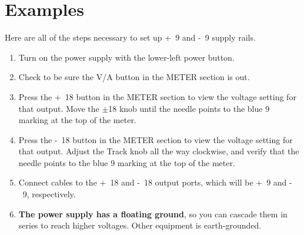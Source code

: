 \documentclass{article}
\begin{document}
\section{Examples}
Here are all of the steps necessary to set up \unit{+9}{\volt} and \unit{-9}{\volt} supply rails.
\begin{enumerate}
\item Turn on the power supply with the lower-left power button.
\item Check to be sure the V/A button in the METER section is out.
\item Press the \unit{+18}{\volt} button in the METER section to view the voltage setting for that output. Move the $\pm$\unit{18}{\volt} knob until the needle points to the blue 9 marking at the top of the meter.
\item Press the \unit{-18}{\volt} button in the METER section to view the voltage setting for that output. Adjust the Track knob all the way clockwise, and verify that the needle points to the blue 9 marking at the top of the meter.
\item Connect cables to the \unit{+18}{\volt} and \unit{-18}{\volt} output ports, which will be \unit{+9}{\volt} and \unit{-9}{\volt}, respectively. 
\item \textbf{The power supply has a floating ground}, so you can cascade them in series to reach higher voltages. Other equipment is earth-grounded.
\end{enumerate}
\end{document}
